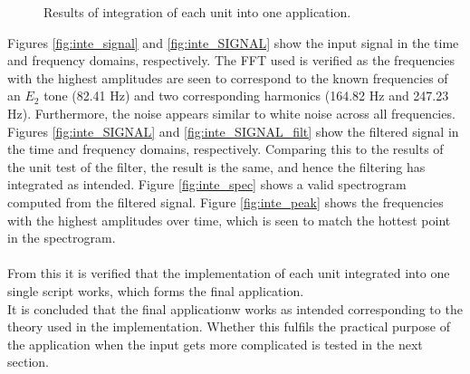 \begin{figure}[H]
\begin{subfigure}{0.49\textwidth}
\end{subfigure}
\caption{Results of integration of each unit into one application.}
\label{fig:inte_validation}
\end{figure}
Figures \ref{fig:inte_signal} and \ref{fig:inte_SIGNAL} show the input signal in the time and frequency domains, respectively. The FFT used is verified as the frequencies with the highest amplitudes are seen to correspond to the known frequencies of an $E_2$ tone (82.41 Hz) and two corresponding harmonics (164.82 Hz and 247.23 Hz). Furthermore, the noise appears similar to white noise across all frequencies.\\
Figures \ref{fig:inte_SIGNAL} and \ref{fig:inte_SIGNAL_filt} show the filtered signal in the time and frequency domains, respectively. Comparing this to the results of the unit test of the filter, the result is the same, and hence the filtering has integrated as intended. Figure \ref{fig:inte_spec} shows a valid spectrogram computed from the filtered signal. Figure \ref{fig:inte_peak} shows the frequencies with the highest amplitudes over time, which is seen to match the hottest point in the spectrogram. \\
\\
From this it is verified that the implementation of each unit integrated into one single script works, which forms the final application. \\
It is concluded that the final applicationw works as intended corresponding to the theory used in the implementation. Whether this fulfils the practical purpose of the application when the input gets more complicated is tested in the next section.